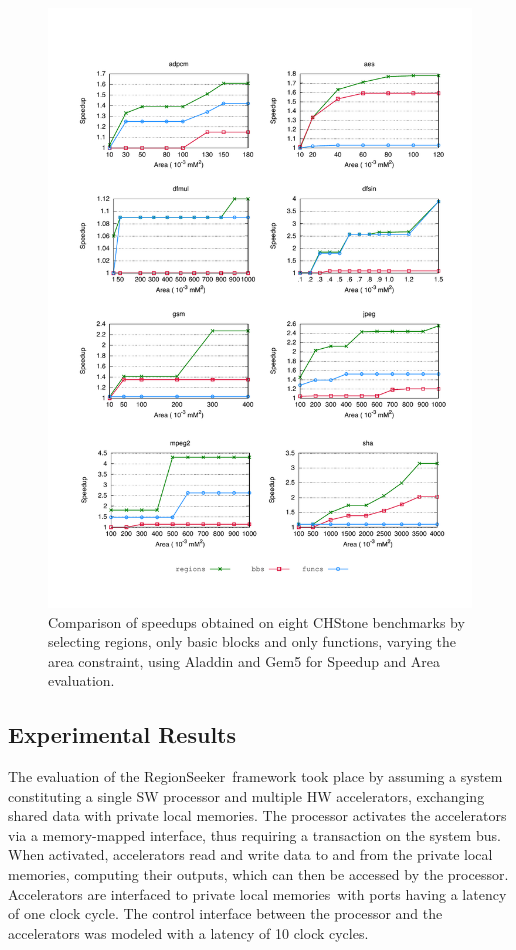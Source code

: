 \documentclass[]{usiinfthesis}
\newcommand{\rseeker}{{RegionSeeker}}
\newcommand{\plms}{{private local memories}}
\begin{document}
\begin{figure}[h!]
\centering
\hspace*{-1cm}
\includegraphics[width= 1.1 \linewidth]{figs/regions_aladdin}
\caption{Comparison of speedups obtained on eight CHStone benchmarks
  by selecting regions, only basic blocks and only functions, varying
  the area constraint, using Aladdin and Gem5 for Speedup and Area evaluation.}
\label{fig:regions_aladdin}
\end{figure}

\subsection{Experimental Results}
\label{subsec:exp}

The evaluation of the \rseeker\ framework took place by assuming a system constituting a single 
SW processor and multiple HW accelerators, exchanging shared data with \plms. The processor 
activates the accelerators via a memory-mapped interface, thus requiring a transaction on the 
system bus. When activated, accelerators read and write data to and from the \plms, computing 
their outputs, which can then be accessed by the processor. Accelerators are interfaced to \plms\ 
with ports having a latency of one clock cycle. The control interface between the processor and 
the accelerators was modeled with a latency of 10 clock cycles.\par
\end{document}
